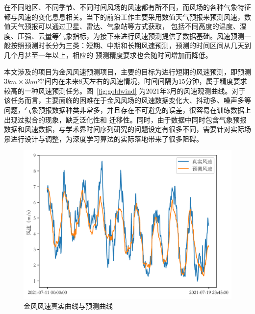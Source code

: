 在不同地区、不同季节、不同时间风场的风速都有所不同，而风场的各种气象特征都与风速的变化息息相关。当下的前沿工作主要采用数值天气预报来预测风速，数值天气预报可以通过卫星、雷达、气象站等方式获取，
包括不同高度的温度、湿度、压强、云量等气象指标，为接下来进行风速预测提供了数据基础。风速预测一般按照预测时长分为三类：短期、中期和长期风速预测，预测的时间区间从几天到几个月甚至一年以上，相应的
预测精度要求也会随时间增加而降低。

本文涉及的项目为金风风速预测项目，主要的目标为进行短期的风速预测，即预测$3km\times3km$空间内在未来$8$天左右的风速情况，时间间隔为$15$分钟，属于精度要求较高的一种风速预测任务。图~\ref{fig:goldwind}
为2021年3月的风速观测曲线。对于该任务而言，主要面临的困难在于金风风场的风速数据变化大、抖动多、噪声多等问题，气象预报数据种类非常多，并且存在不可避免的误差，很容易在训练数据上出现过拟合的现象，缺乏泛化性和
迁移性。同时，由于数据中同时包含气象预报数据和风速数据，与学术界时间序列研究的问题设定有很多不同，需要针对实际场景进行设计与调整，为深度学习算法的实际落地带来了很多阻碍。

\begin{figure}
  \centering
  \includegraphics[width=0.75\linewidth]{figures/wind2.png}
  \caption{金风风速真实曲线与预测曲线}
  \label{fig:pred}
\end{figure}


